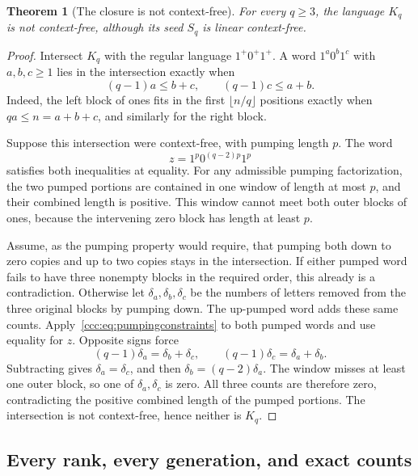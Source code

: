 \documentclass[11pt,letterpaper]{article}
\newtheorem{theorem}{Theorem}[section]
\theoremstyle{definition}
\theoremstyle{remark}
\begin{document}
\begin{theorem}[The closure is not context-free]\label{ccc:thm:noncfl}
For every $q\geq3$, the language $K_q$ is not context-free, although its seed
$S_q$ is linear context-free.
\end{theorem}
\begin{proof}
Intersect $K_q$ with the regular language $1^+0^+1^+$. A word
$1^a0^b1^c$ with $a,b,c\geq1$ lies in the intersection exactly when
\begin{equation}
 (q-1)a\leq b+c,\qquad (q-1)c\leq a+b.
 \label{ccc:eq:pumpingconstraints}
\end{equation}
Indeed, the left block of ones fits in the first $\lfloor n/q\rfloor$
positions exactly when $qa\leq n=a+b+c$, and similarly for the right block.

Suppose this intersection were context-free, with pumping length $p$.
The word
\[
 z=1^p0^{(q-2)p}1^p
\]
satisfies both inequalities at equality. For any admissible pumping
factorization, the two pumped portions are contained in one window of
length at most $p$, and their combined length is positive. This window
cannot meet both outer blocks of ones, because the intervening zero block
has length at least $p$.

Assume, as the pumping property would require, that pumping both down to zero
copies and up to two copies stays in the intersection. If either pumped word
fails to have three nonempty blocks in the required order, this already is a
contradiction. Otherwise let $\delta_a,\delta_b,\delta_c$ be the numbers of
letters removed from the three original blocks by pumping down. The up-pumped
word adds these same counts. Apply~\eqref{ccc:eq:pumpingconstraints} to both
pumped words and use equality for $z$. Opposite signs force
\[
 (q-1)\delta_a=\delta_b+\delta_c,\qquad
 (q-1)\delta_c=\delta_a+\delta_b.
\]
Subtracting gives $\delta_a=\delta_c$, and then
$\delta_b=(q-2)\delta_a$. The window misses at least one outer block, so
one of $\delta_a,\delta_c$ is zero. All three counts are therefore zero,
contradicting the positive combined length of the pumped portions.
The intersection is not context-free, hence neither is $K_q$.
\end{proof}

\subsection{Every rank, every generation, and exact counts}
\end{document}
